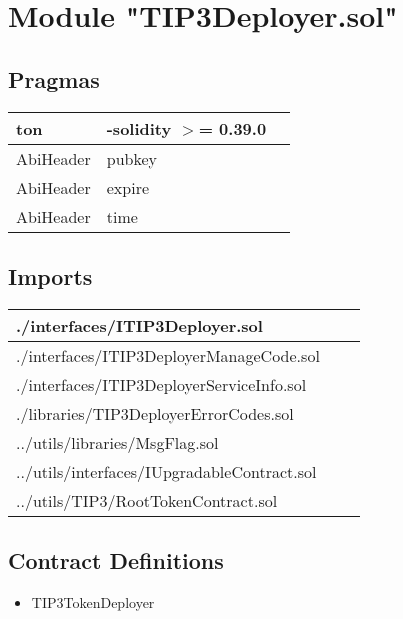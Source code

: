 
\section{Module "TIP3Deployer.sol"}


\subsection{Pragmas}


\noindent\begin{tabular}{|l|l|p{5cm}|}\hline
ton & -solidity $>$= 0.39.0 &\\\hline
AbiHeader &  pubkey &\\\hline
AbiHeader &  expire &\\\hline
AbiHeader &  time &\\\hline
\end{tabular}


\subsection{Imports}


\noindent\begin{tabular}{|l|l|p{5cm}|}\hline
./interfaces/ITIP3Deployer.sol &\\\hline
./interfaces/ITIP3DeployerManageCode.sol &\\\hline
./interfaces/ITIP3DeployerServiceInfo.sol &\\\hline
./libraries/TIP3DeployerErrorCodes.sol &\\\hline
../utils/libraries/MsgFlag.sol &\\\hline
../utils/interfaces/IUpgradableContract.sol &\\\hline
../utils/TIP3/RootTokenContract.sol &\\\hline
\end{tabular}


\subsection{Contract Definitions}

\begin{itemize}
\item TIP3TokenDeployer
\end{itemize}
